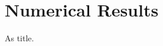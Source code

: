 \documentclass[Thesis.tex]{subfiles}
\begin{document}
\setcounter{section}{2}

\section{Numerical Results}
\label{sec:res}
As title.
\end{document}
